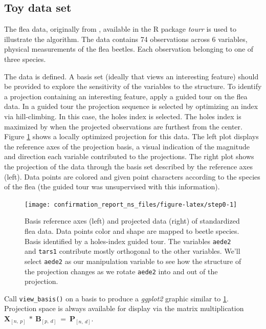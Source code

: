 \documentclass{monashthesis}
\begin{document}
\hypertarget{toy-data-set}{%
\subsection{Toy data set}\label{toy-data-set}}

The flea data, originally from \textcite{lubischew_use_1962}, available in the R package \emph{tourr} \autocite{wickham_tourr_2011} is used to illustrate the algorithm. The data contains 74 observations across 6 variables, physical measurements of the flea beetles. Each observation belonging to one of three species.

The data is defined. A basis set (ideally that views an interesting feature) should be provided to explore the sensitivity of the variables to the structure. To identify a projection containing an interesting feature, apply
a guided tour\autocite{cook_interactive_2007} on the flea data. In a guided tour the projection sequence is selected by optimizing an index via hill-climbing. In this case, the holes index is selected. The holes index is maximized by when the projected observations are furthest from the center. Figure \ref{fig:step0} shows a locally optimized projection for this data. The left plot displays the reference axes of the projection basis, a visual indication of the magnitude and direction each variable contributed to the projections. The right plot shows the projection of the data through the basis set described by the reference axes (left). Data points are colored and given point characters according to the species of the flea (the guided tour was unsupervised with this information).



\begin{figure}

{\centering \texttt{[image: confirmation\_report\_ns\_files/figure-latex/step0-1]} 

}

\caption{Basis reference axes (left) and projected data (right) of standardized flea data. Data points color and shape are mapped to beetle species. Basis identified by a holes-index guided tour. The variables \texttt{aede2} and \texttt{tars1} contribute mostly orthogonal to the other variables. We'll select \texttt{aede2} as our manipulation variable to see how the structure of the projection changes as we rotate \texttt{aede2} into and out of the projection.}\label{fig:step0}
\end{figure}

Call \texttt{view\_basis()} on a basis to produce a \emph{ggplot2} graphic similar to \ref{fig:step0}. Projection space is always available for display via the matrix multiplication \(\textbf{X}_{[n,~p]} ~*~ \textbf{B}_{[p,~d]} ~=~ \textbf{P}_{[n,~d]}\).
\end{document}
